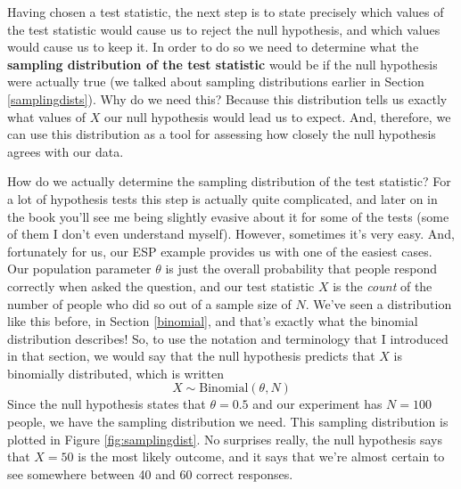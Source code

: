\documentclass[
]{book}
\begin{document}
Having chosen a test statistic, the next step is to state precisely which values of the test statistic would cause us to reject the null hypothesis, and which values would cause us to keep it. In order to do so we need to determine what the {\textbf{sampling distribution of the test statistic}} would be if the null hypothesis were actually true (we talked about sampling distributions earlier in Section \ref{samplingdists}). Why do we need this? Because this distribution tells us exactly what values of \(X\) our null hypothesis would lead us to expect. And, therefore, we can use this distribution as a tool for assessing how closely the null hypothesis agrees with our data.

How do we actually determine the sampling distribution of the test statistic? For a lot of hypothesis tests this step is actually quite complicated, and later on in the book you'll see me being slightly evasive about it for some of the tests (some of them I don't even understand myself). However, sometimes it's very easy. And, fortunately for us, our ESP example provides us with one of the easiest cases. Our population parameter \(\theta\) is just the overall probability that people respond correctly when asked the question, and our test statistic \(X\) is the \emph{count} of the number of people who did so out of a sample size of \(N\). We've seen a distribution like this before, in Section \ref{binomial}, and that's exactly what the binomial distribution describes! So, to use the notation and terminology that I introduced in that section, we would say that the null hypothesis predicts that \(X\) is binomially distributed, which is written
\[
X \sim \mbox{Binomial}(\theta,N)
\]
Since the null hypothesis states that \(\theta = 0.5\) and our experiment has \(N=100\) people, we have the sampling distribution we need. This sampling distribution is plotted in Figure \ref{fig:samplingdist}. No surprises really, the null hypothesis says that \(X=50\) is the most likely outcome, and it says that we're almost certain to see somewhere between 40 and 60 correct responses.
\end{document}
